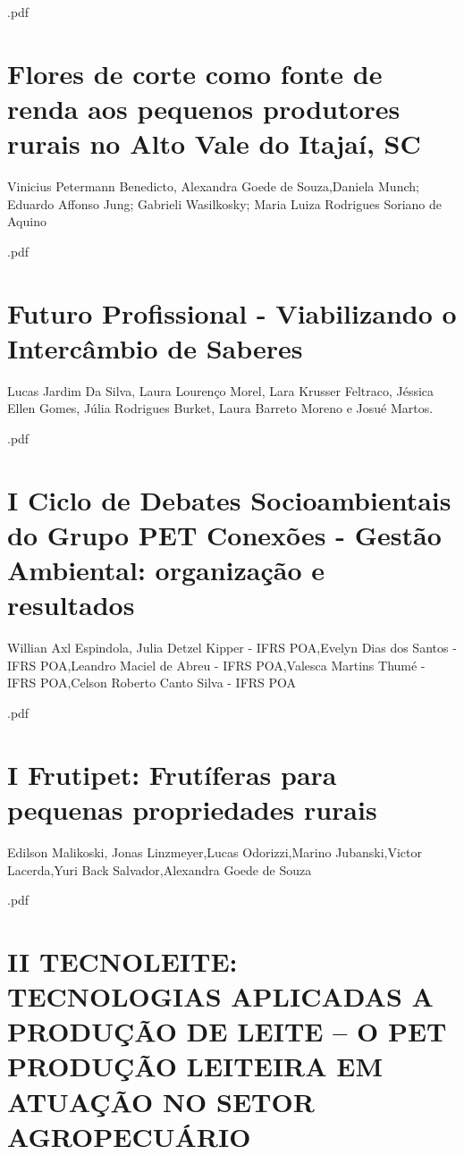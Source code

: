 

.pdf\section{Flores de corte como fonte de renda aos pequenos produtores rurais no Alto Vale do Itajaí, SC}

Vinicius Petermann Benedicto, Alexandra Goede de Souza,Daniela Munch; Eduardo Affonso Jung;  Gabrieli Wasilkosky; Maria Luiza Rodrigues Soriano de Aquino



.pdf\section{Futuro Profissional - Viabilizando o Intercâmbio de Saberes}

Lucas Jardim Da Silva, Laura Lourenço Morel, Lara Krusser Feltraco, Jéssica Ellen Gomes, Júlia Rodrigues Burket, Laura Barreto Moreno e Josué Martos.



.pdf\section{I Ciclo de Debates Socioambientais do Grupo PET Conexões - Gestão Ambiental: organização e resultados}

Willian Axl Espindola, Julia Detzel Kipper - IFRS POA,Evelyn Dias dos Santos - IFRS POA,Leandro Maciel de Abreu - IFRS POA,Valesca Martins Thumé - IFRS POA,Celson Roberto Canto Silva - IFRS POA



.pdf\section{I Frutipet: Frutíferas para pequenas propriedades rurais}

Edilson Malikoski, Jonas Linzmeyer,Lucas Odorizzi,Marino Jubanski,Victor Lacerda,Yuri Back Salvador,Alexandra Goede de Souza



.pdf\section{II TECNOLEITE: TECNOLOGIAS APLICADAS A PRODUÇÃO DE LEITE – O PET PRODUÇÃO LEITEIRA EM ATUAÇÃO NO SETOR AGROPECUÁRIO}

